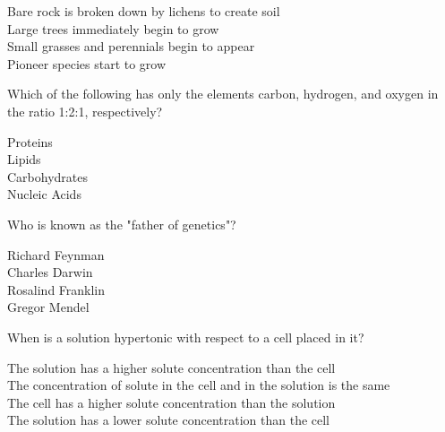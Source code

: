 \documentclass{exam}
\begin{document}
\begin{questions}
\begin{oneparchoices}
	\choice Bare rock is broken down by lichens to create soil
	\\
	\choice Large trees immediately begin to grow
	\\
	\choice Small grasses and perennials begin to appear
	\\
	\choice Pioneer species start to grow
\end{oneparchoices}

	\question Which of the following has only the elements carbon, hydrogen, and oxygen in the ratio 1:2:1, respectively?

\begin{oneparchoices}
	\choice Proteins
	\\
	\choice Lipids
	\\
	\choice Carbohydrates
	\\
	\choice Nucleic Acids
\end{oneparchoices}


\question Who is known as the "father of genetics"?

\begin{oneparchoices}
	\choice Richard Feynman
	\\
	\choice Charles Darwin
	\\
	\choice Rosalind Franklin
	\\
	\choice Gregor Mendel
\end{oneparchoices}


\question When is a solution hypertonic with respect to a cell placed in it?

\begin{oneparchoices}
	\choice The solution has a higher solute concentration than the cell
	\\
	\choice The concentration of solute in the cell and in the solution is the same
	\\
	\choice The cell has a higher solute concentration than the solution
	\\
	\choice The solution has a lower solute concentration than the cell
\end{oneparchoices}

\end{questions}
\end{document}
